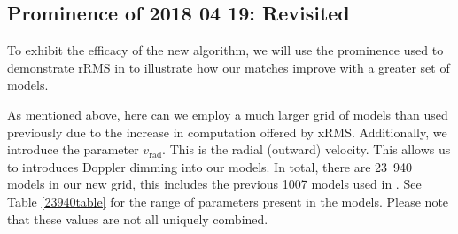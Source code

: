 \subsection{Prominence of 2018 04 19: Revisited}

To exhibit the efficacy of the new algorithm, we will use the prominence used to demonstrate rRMS in  to illustrate how our matches improve with a greater set of models.

As mentioned above, here can we employ a much larger grid of models than used previously due to the increase in computation offered by xRMS. Additionally, we introduce the parameter $v_\text{rad}$. This is the radial (outward) velocity. This allows us to introduces Doppler dimming into our models. In total, there are 23~940 models in our new grid, this includes the previous 1007 models used in . See Table \ref{23940table} for the range of parameters present in the models. Please note that these values are not all uniquely combined.
